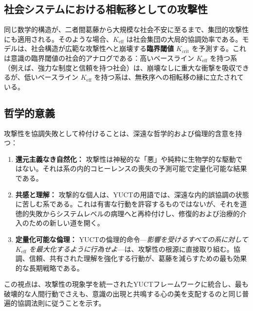 \documentclass[12pt,a4paper]{article}
\begin{document}
	\subsection{社会システムにおける相転移としての攻撃性}
	
	同じ数学的構造が、二者間葛藤から大規模な社会不安に至るまで、集団的攻撃性にも適用される。そのような場合、\(K_{\mathrm{eff}}\) は社会集団の大局的協調効率である。モデルは、社会構造が広範な攻撃性へと崩壊する\textbf{臨界閾値} \(K_{\mathrm{crit}}\) を予測する。これは意識の臨界閾値の社会的アナログである：高いベースライン \(K_{\mathrm{eff}}\) を持つ系（例えば、強力な制度と信頼を持つ社会）は、崩壊なしに重大な衝撃を吸収できるが、低いベースライン \(K_{\mathrm{eff}}\) を持つ系は、無秩序への相転移の縁に立たされている。
	
	\subsection{哲学的意義}
	
	攻撃性を協調失敗として枠付けることは、深遠な哲学的および倫理的含意を持つ：
	
	\begin{enumerate}
		\item \textbf{還元主義なき自然化：} 攻撃性は神秘的な「悪」や純粋に生物学的な駆動ではない。それは系の内的コヒーレンスの喪失の予測可能で定量化可能な結果である。
		\item \textbf{共感と理解：} 攻撃的な個人は、YUCTの用語では、深遠な内的誤協調の状態に苦しむ系である。これは有害な行動を許容するものではないが、それを道徳的失敗からシステムレベルの病理へと再枠付けし、修復的および治療的介入のための新しい道を開く。
		\item \textbf{定量化可能な倫理：} YUCTの倫理的命令—\textit{影響を受けるすべての系に対して \(K_{\mathrm{eff}}\) を最大化するように行為せよ}—は、攻撃性の根源に直接取り組む。協調、信頼、共有された理解を強化する行動が、葛藤を減らすための最も効果的な長期戦略である。
	\end{enumerate}
	
	この視点は、攻撃性の現象学を統一されたYUCTフレームワークに統合し、最も破壊的な人間行動でさえも、意識の出現と共鳴する心の美を支配するのと同じ普遍的協調法則に従うことを示す。
	
\end{document}
